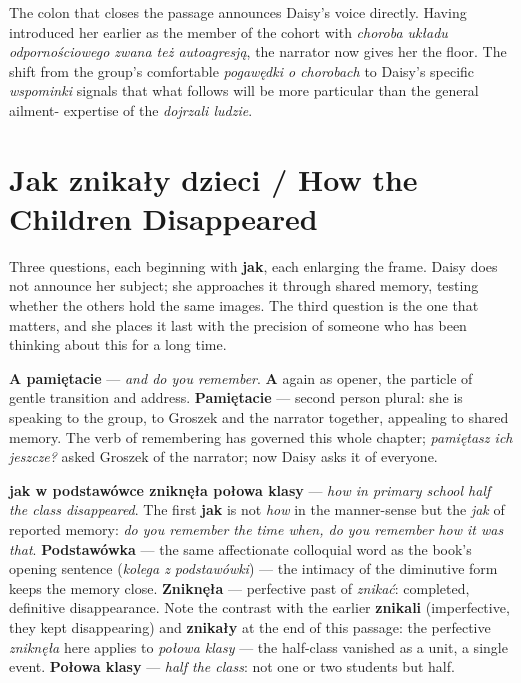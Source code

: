 \medskip
The colon that closes the passage announces Daisy's
voice directly. Having introduced her earlier as
the member of the cohort with \textit{choroba układu
odpornościowego zwana też autoagresją}, the narrator
now gives her the floor. The shift from the group's
comfortable \textit{pogawędki o chorobach} to Daisy's
specific \textit{wspominki} signals that what follows
will be more particular than the general ailment-
expertise of the \textit{dojrzali ludzie}.

\section{Jak znikały dzieci / How the Children Disappeared}



Three questions, each beginning with \textbf{jak}, each
enlarging the frame. Daisy does not announce her subject;
she approaches it through shared memory, testing whether
the others hold the same images. The third question is
the one that matters, and she places it last with the
precision of someone who has been thinking about this
for a long time.

\textbf{A pamiętacie} --- \textit{and do you remember}.
\textbf{A} again as opener, the particle of gentle
transition and address. \textbf{Pamiętacie} --- second
person plural: she is speaking to the group, to Groszek
and the narrator together, appealing to shared memory.
The verb of remembering has governed this whole chapter;
\textit{pamiętasz ich jeszcze?} asked Groszek of the
narrator; now Daisy asks it of everyone.

\textbf{jak w podstawówce zniknęła połowa klasy} ---
\textit{how in primary school half the class disappeared}.
The first \textbf{jak} is not \textit{how} in the
manner-sense but the \textit{jak} of reported memory:
\textit{do you remember the time when, do you remember
how it was that}. \textbf{Podstawówka} --- the same
affectionate colloquial word as the book's opening
sentence (\textit{kolega z podstawówki}) --- the
intimacy of the diminutive form keeps the memory
close. \textbf{Zniknęła} --- perfective past of
\textit{znikać}: completed, definitive disappearance.
Note the contrast with the earlier \textbf{znikali}
(imperfective, they kept disappearing) and
\textbf{znikały} at the end of this passage: the
perfective \textit{zniknęła} here applies to
\textit{połowa klasy} --- the half-class vanished as
a unit, a single event. \textbf{Połowa klasy} ---
\textit{half the class}: not one or two students
but half.

